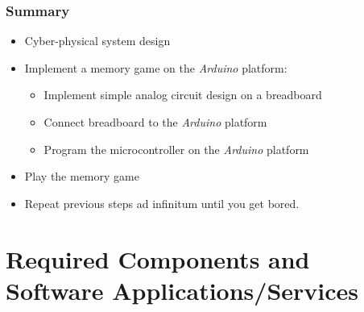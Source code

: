 \documentclass[xcolor={usenames,dvipsnames},hyperref={hyperindex,bookmarks}]{beamer}
\begin{document}
\frame
{
	\frametitle{Summary}

	\begin{itemize}
	\item Cyber-physical system design
	\item Implement a memory game on the {\it Arduino} platform: %
		\begin{itemize} %
		\item Implement simple analog circuit design on a breadboard
		\item Connect breadboard to the {\it Arduino} platform
		\item Program the microcontroller on the {\it Arduino} platform
		\end{itemize}
	\item Play the memory game
	\item Repeat previous steps ad infinitum until you get bored.
	\end{itemize}
}









\section{Required Components and Software Applications/Services}
\end{document}

